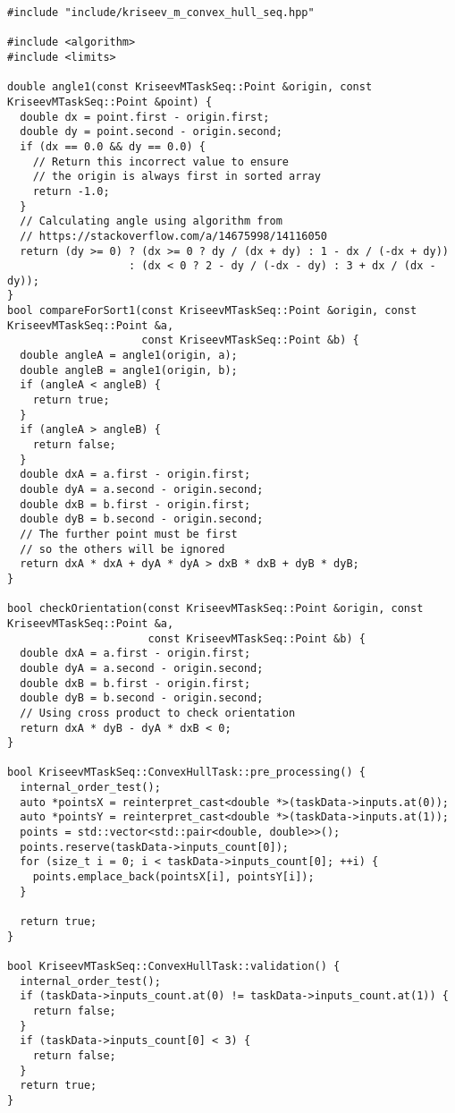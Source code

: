 \documentclass[a4paper,12pt]{article}
\begin{document}
\begin{lstlisting}
#include "include/kriseev_m_convex_hull_seq.hpp"

#include <algorithm>
#include <limits>

double angle1(const KriseevMTaskSeq::Point &origin, const KriseevMTaskSeq::Point &point) {
  double dx = point.first - origin.first;
  double dy = point.second - origin.second;
  if (dx == 0.0 && dy == 0.0) {
    // Return this incorrect value to ensure
    // the origin is always first in sorted array
    return -1.0;
  }
  // Calculating angle using algorithm from
  // https://stackoverflow.com/a/14675998/14116050
  return (dy >= 0) ? (dx >= 0 ? dy / (dx + dy) : 1 - dx / (-dx + dy))
                   : (dx < 0 ? 2 - dy / (-dx - dy) : 3 + dx / (dx - dy));
}
bool compareForSort1(const KriseevMTaskSeq::Point &origin, const KriseevMTaskSeq::Point &a,
                     const KriseevMTaskSeq::Point &b) {
  double angleA = angle1(origin, a);
  double angleB = angle1(origin, b);
  if (angleA < angleB) {
    return true;
  }
  if (angleA > angleB) {
    return false;
  }
  double dxA = a.first - origin.first;
  double dyA = a.second - origin.second;
  double dxB = b.first - origin.first;
  double dyB = b.second - origin.second;
  // The further point must be first
  // so the others will be ignored
  return dxA * dxA + dyA * dyA > dxB * dxB + dyB * dyB;
}

bool checkOrientation(const KriseevMTaskSeq::Point &origin, const KriseevMTaskSeq::Point &a,
                      const KriseevMTaskSeq::Point &b) {
  double dxA = a.first - origin.first;
  double dyA = a.second - origin.second;
  double dxB = b.first - origin.first;
  double dyB = b.second - origin.second;
  // Using cross product to check orientation
  return dxA * dyB - dyA * dxB < 0;
}

bool KriseevMTaskSeq::ConvexHullTask::pre_processing() {
  internal_order_test();
  auto *pointsX = reinterpret_cast<double *>(taskData->inputs.at(0));
  auto *pointsY = reinterpret_cast<double *>(taskData->inputs.at(1));
  points = std::vector<std::pair<double, double>>();
  points.reserve(taskData->inputs_count[0]);
  for (size_t i = 0; i < taskData->inputs_count[0]; ++i) {
    points.emplace_back(pointsX[i], pointsY[i]);
  }

  return true;
}

bool KriseevMTaskSeq::ConvexHullTask::validation() {
  internal_order_test();
  if (taskData->inputs_count.at(0) != taskData->inputs_count.at(1)) {
    return false;
  }
  if (taskData->inputs_count[0] < 3) {
    return false;
  }
  return true;
}


\end{lstlisting}
\end{document}
